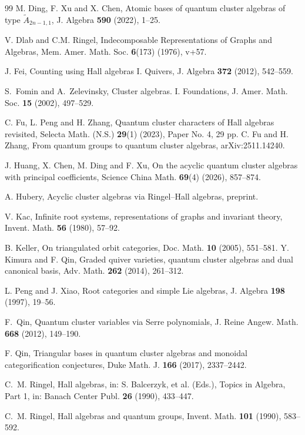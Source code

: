 \documentclass[reqno,12pt]{amsart}
\numberwithin{equation}{section}
\theoremstyle{plain} %
\theoremstyle{definition} %
\begin{document}
\begin{thebibliography}{99}
 M. Ding, F. Xu and X. Chen, Atomic bases of quantum cluster algebras of type $\widetilde{A}_{2n-1,1}$, J. Algebra {\bf 590} (2022), 1--25.


 V. Dlab and C.M. Ringel, Indecomposable Representations of Graphs and Algebras, Mem. Amer. Math. Soc. {\bf 6}(173) (1976), v+57.


 J. Fei, Counting using Hall algebras I. Quivers, J. Algebra \textbf{372} (2012), 542--559.


 S.~Fomin and A.~Zelevinsky,  Cluster algebras. I. Foundations,  J. Amer. Math. Soc. \textbf{15} (2002), 497--529.


 C. Fu, L. Peng and H. Zhang, Quantum cluster characters of Hall algebras revisited, Selecta Math.
(N.S.) {\bf 29}(1) (2023), Paper No. 4, 29 pp.
 C. Fu and H. Zhang, From quantum groups to quantum cluster algebras, arXiv:2511.14240.

J. Huang, X. Chen, M. Ding and F. Xu, {On the acyclic quantum cluster algebras with principal coefficients}, Science China Math. {\bf 69}(4) (2026), 857--874.

 A. Hubery, Acyclic cluster algebras via Ringel--Hall algebras, preprint.


 V. Kac, {Infinite root systems, representations of graphs and invariant theory}, Invent. Math. \textbf{56} (1980), 57--92.

 B. Keller, On triangulated orbit categories, Doc. Math. {\bf 10} (2005), 551--581.
 Y. Kimura and F. Qin, Graded quiver varieties, quantum cluster algebras and dual canonical basis, Adv.
Math. {\bf 262} (2014), 261--312.

 L. Peng and J. Xiao, {Root categories and simple Lie algebras}, J. Algebra {\bf 198} (1997), 19--56.

 F.~Qin,  Quantum cluster variables via Serre polynomials,
J. Reine Angew. Math. {\bf 668} (2012), 149--190.


 F. Qin, Triangular bases in quantum cluster algebras and monoidal categorification conjectures,  Duke Math. J. {\bf 166} (2017), 2337--2442.

 C.~M. Ringel, {Hall algebras}, in: S. Balcerzyk, et al. (Eds.), Topics in Algebra, Part 1, in: Banach Center Publ. {\bf 26} (1990), 433--447.

 C.~M. Ringel, {Hall algebras and quantum groups},
Invent. Math. {\bf 101} (1990), 583--592.



\end{thebibliography}
\end{document}
